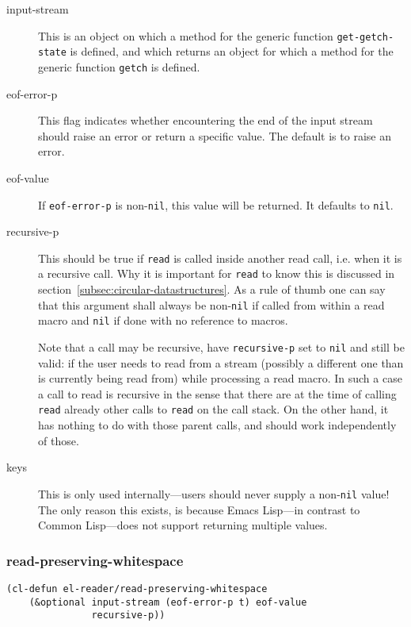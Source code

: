 \documentclass[a4paper,10pt,twoside]{report}
\newcommand{\el}{Emacs Lisp}
\newcommand{\cl}{Common Lisp}
\newcommand{\sym}[1]{\texttt{#1}}
\newcommand{\fun}[1]{\texttt{#1}}
\newcommand{\Read}{\fun{read}}
\newcommand{\nil}{\sym{nil}}
\begin{document}
\begin{description}
\item[input-stream] This is an object on which a method for the generic function
  \fun{get-getch-state} is defined, and which returns an object for which a
  method for the generic function \fun{getch} is defined.
\item[eof-error-p] This flag indicates whether encountering the end of the input
  stream should raise an error or return a specific value.  The default is to
  raise an error. 
\item[eof-value] If \sym{eof-error-p} is non-\nil{}, this value will be
  returned.  It defaults to \nil{}.
\item[recursive-p] This should be true if \Read{} is called inside another read
  call, i.e. when it is a recursive call.  Why it is important for \Read{} to
  know this is discussed in section~\ref{subsec:circular-datastructures}.  As a
  rule of thumb one can say that this argument shall always be non-\nil{} if
  called from within a read macro and \nil{} if done with no reference to
  macros.

  Note that a call may be recursive, have \sym{recursive-p} set to \nil{} and
  still be valid: if the user needs to read from a stream (possibly a different
  one than is currently being read from) while processing a read macro.  In such
  a case a call to read is recursive in the sense that there are at the time of
  calling \Read{} already other calls to \Read{} on the call stack.  On the
  other hand, it has nothing to do with those parent calls, and should work
  independently of those.
\item[keys] This is only used internally---users should never supply a
  non-\nil{} value!  The only reason this exists, is because \el{}---in contrast
  to \cl{}---does not support returning multiple values.
\end{description}

\subsubsection{read-preserving-whitespace}
\label{subsubsec:read-preserving-whitespace}

\begin{lstlisting}[style=lispinline]
(cl-defun el-reader/read-preserving-whitespace
    (&optional input-stream (eof-error-p t) eof-value
               recursive-p))
\end{lstlisting}
\end{document}
